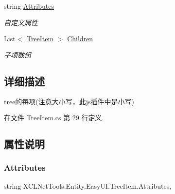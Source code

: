 \begin{DoxyCompactItemize}
string \hyperlink{class_x_c_l_net_tools_1_1_entity_1_1_easy_u_i_1_1_tree_item_a8f59dd785ca1acd2b70d5c159b711552}{Attributes}
\begin{DoxyCompactList}\small\item\em 自定义属性 \end{DoxyCompactList}\item 
List$<$ \hyperlink{class_x_c_l_net_tools_1_1_entity_1_1_easy_u_i_1_1_tree_item}{Tree\+Item} $>$ \hyperlink{class_x_c_l_net_tools_1_1_entity_1_1_easy_u_i_1_1_tree_item_a70ed6a7899043a9f8de3f28794ebd720}{Children}
\begin{DoxyCompactList}\small\item\em 子项数组 \end{DoxyCompactList}\end{DoxyCompactItemize}


\subsection{详细描述}
tree的每项(注意大小写，此js插件中是小写) 



在文件 Tree\+Item.\+cs 第 29 行定义.



\subsection{属性说明}
\mbox{\label{class_x_c_l_net_tools_1_1_entity_1_1_easy_u_i_1_1_tree_item_a8f59dd785ca1acd2b70d5c159b711552}} 
\subsubsection{\texorpdfstring{Attributes}{Attributes}}
{\footnotesize\ttfamily string X\+C\+L\+Net\+Tools.\+Entity.\+Easy\+U\+I.\+Tree\+Item.\+Attributes\hspace{0.3cm}{\ttfamily [get]}, {\ttfamily [set]}}



